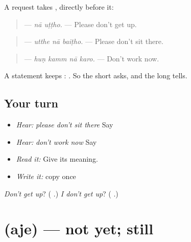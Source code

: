 \begin{grammarlens}[title={Grammar Lens: \pa{ਨਾ} for a request, \pa{ਨਹੀਂ} for a statement}]
A request takes \textbf{}, directly before it:

\begin{quote}
\textbf{ } — \emph{nā uṭṭho.} — Please don't get up.
\end{quote}

\begin{quote}
\textbf{  } — \emph{utthe nā baiṭho.} — Please don't sit there.
\end{quote}

\begin{quote}
\textbf{   } — \emph{huṇ kamm nā karo.} — Don't work now.
\end{quote}

A statement keeps \textbf{}: \textbf{    }. So the short \textbf{} asks, and the long \textbf{} tells.
\end{grammarlens}

\subsection*{Your turn}
\begin{itemize}
\raggedright
  \item \emph{Hear:} \emph{please don't sit there} Say \textbf{  }
  \item \emph{Hear:} \emph{don't work now} Say \textbf{   }
  \item \emph{Read it:} \textbf{ } Give its meaning.
  \item \emph{Write it:} copy \textbf{ } once
\end{itemize}

\begin{tcolorbox}[breakable,colback=teal!4,colframe=teal!35!black,title={Before you move on}]
\emph{Don't get up}? (\textbf{ }.) \emph{I don't get up}? (\textbf{   }.)
\end{tcolorbox}
\section[\texorpdfstring{\pa{ਅਜੇ} (aje)}{ਅਜੇ (aje)}]{ (aje) — not yet; still}

